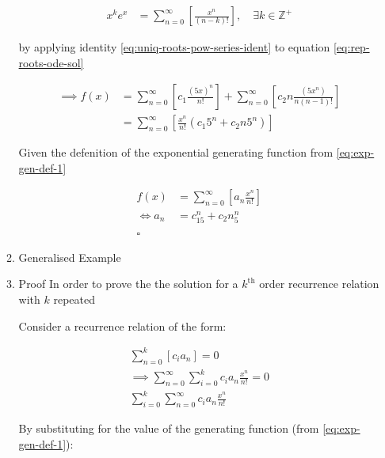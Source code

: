 \documentclass[11pt]{article}
\begin{document}
\begin{enumerate}
\begin{enumerate}
\begin{align}
    x^ke^x &= \sum^{\infty}_{n= 0}   {\left[{ \frac{x^n}{{\left({ n- k }\right)}!} }\right]}, \quad \exists k \in \mathbb{Z}^+ \label{eq:uniq-roots-pow-series-ident}
\end{align}

by applying identity \eqref{eq:uniq-roots-pow-series-ident} to equation \eqref{eq:rep-roots-ode-sol}

\begin{align}
    \implies  f{\left({ x }\right)} &= \sum^{\infty}_{n= 0}   {\left[{ c_1 \frac{{\left({ 5x }\right)}^n}{n!} }\right]}  +  \sum^{\infty}_{n= 0}   {\left[{ c_2 n \frac{{\left({ 5x^n }\right)}}{n{\left({ n-1 }\right)}!} }\right]} \nonumber \\
 &= \sum^{\infty}_{n= 0}   {\left[{ \frac{x^n}{n!} {\left({ c_{1}5^n +  c_2 n 5^n   }\right)} }\right]} \nonumber
\end{align}

Given the defenition of the exponential generating function from \eqref{eq:exp-gen-def-1}

\begin{align}
    f{\left({ x }\right)}&=     \sum^{\infty}_{n= 0}   {\left[{ a_n \frac{x^n}{n!} }\right]} \nonumber \\
    \iff a_n &= c_{15}^n +  c_2n_5^n \nonumber \\ \nonumber
    \ \nonumber \\
    \square \nonumber
\end{align}
\item Generalised Example
\label{sec:orgdf7560e}

\item Proof
\label{sec:orgc709b7f}
In order to prove the the solution for a \(k^{\mathrm{th}}\) order recurrence relation with \(k\) repeated


Consider a recurrence relation of the form:

\begin{align}
     \sum^{k}_{n= 0}   {\left[{ c_i a_n }\right]}  = 0 \nonumber \\
      \implies  \sum^{\infty}_{n= 0}   \sum^{k}_{i= 0}   c_i a_n \frac{x^n}{n!} = 0 \nonumber \\
      \sum^{k}_{i= 0}   \sum^{\infty}_{n= 0}   c_i a_n \frac{x^n}{n!} \nonumber
\end{align}

By substituting for the value of the generating function (from \eqref{eq:exp-gen-def-1}):


\end{enumerate}
\end{enumerate}
\end{document}
